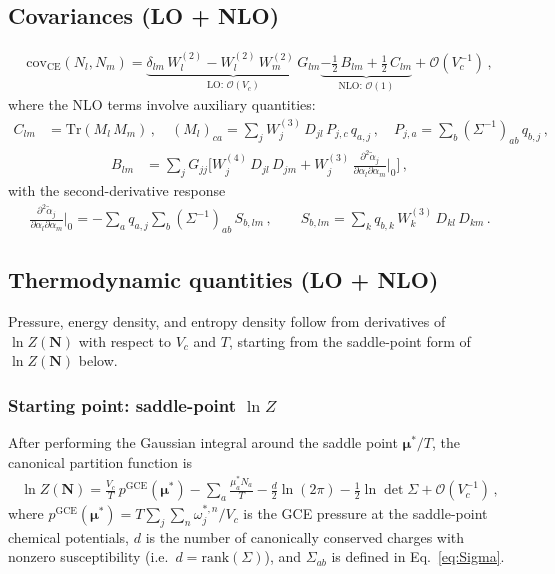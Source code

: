 \documentclass[11pt]{article}
\newcommand{\bmu}{\bm{\mu}}
\newcommand{\bN}{\mathbf{N}}
\newcommand{\Tr}{\mathrm{Tr}}
\newcommand{\CE}{\mathrm{CE}}
\newcommand{\GCE}{\mathrm{GCE}}
\newcommand{\covv}{\mathrm{cov}}
\begin{document}
\subsection{Covariances (LO + NLO)}

\begin{align}
  \covv_\CE(N_l, N_m)
  = \underbrace{\delta_{lm}\,W_l^{(2)} - W_l^{(2)}\,W_m^{(2)}\,G_{lm}}_{\text{LO: } \mathcal{O}(V_c)}
  \underbrace{- \frac{1}{2}\,B_{lm} + \frac{1}{2}\,C_{lm}}_{\text{NLO: } \mathcal{O}(1)}
  + \mathcal{O}(V_c^{-1}) \,,
  \label{eq:cov}
\end{align}
where the NLO terms involve auxiliary quantities:
\begin{align}
  C_{lm} &= \Tr(M_l\,M_m) \,, \quad
  (M_l)_{ca} = \sum_j W_j^{(3)}\,D_{jl}\,P_{j,c}\,q_{a,j} \,,
  \quad P_{j,a} = \sum_b (\Sigma^{-1})_{ab}\,q_{b,j} \,,
  \label{eq:Clm}
\end{align}
\begin{align}
  B_{lm} &= \sum_j G_{jj}\Big[W_j^{(4)}\,D_{jl}\,D_{jm}
  + W_j^{(3)}\,\frac{\partial^2\tilde{\alpha}_j}{\partial\alpha_l\partial\alpha_m}\bigg|_0\Big] \,,
  \label{eq:Blm}
\end{align}
with the second-derivative response
\begin{align}
  \frac{\partial^2\tilde{\alpha}_j}{\partial\alpha_l\partial\alpha_m}\bigg|_0
  = -\sum_a q_{a,j}\sum_b (\Sigma^{-1})_{ab}\,S_{b,lm} \,,
  \qquad
  S_{b,lm} = \sum_k q_{b,k}\,W_k^{(3)}\,D_{kl}\,D_{km} \,.
  \label{eq:d2alpha}
\end{align}

\subsection{Thermodynamic quantities (LO + NLO)}
\label{sec:thermo}

Pressure, energy density, and entropy density follow from derivatives of $\ln Z(\bN)$ with respect to $V_c$ and $T$, starting from the saddle-point form of $\ln Z(\bN)$ below.

\subsubsection{Starting point: saddle-point $\ln Z$}

After performing the Gaussian integral around the saddle point $\bmu^*/T$, the canonical partition function is
\begin{align}
  \ln Z(\bN) = \frac{V_c}{T}\,p^{\GCE}(\bmu^*) - \sum_a \frac{\mu_a^* N_a}{T}
  - \frac{d}{2}\ln(2\pi) - \frac{1}{2}\ln\det\Sigma + \mathcal{O}(V_c^{-1}) \,,
  \label{eq:lnZ_SP}
\end{align}
where $p^{\GCE}(\bmu^*) = T\sum_j \sum_n \omega_j^{*,n}/V_c$ is the GCE pressure at the saddle-point chemical potentials, $d$ is the number of canonically conserved charges with nonzero susceptibility (i.e.\ $d = \mathrm{rank}(\Sigma)$), and $\Sigma_{ab}$ is defined in Eq.~\eqref{eq:Sigma}.
\end{document}
